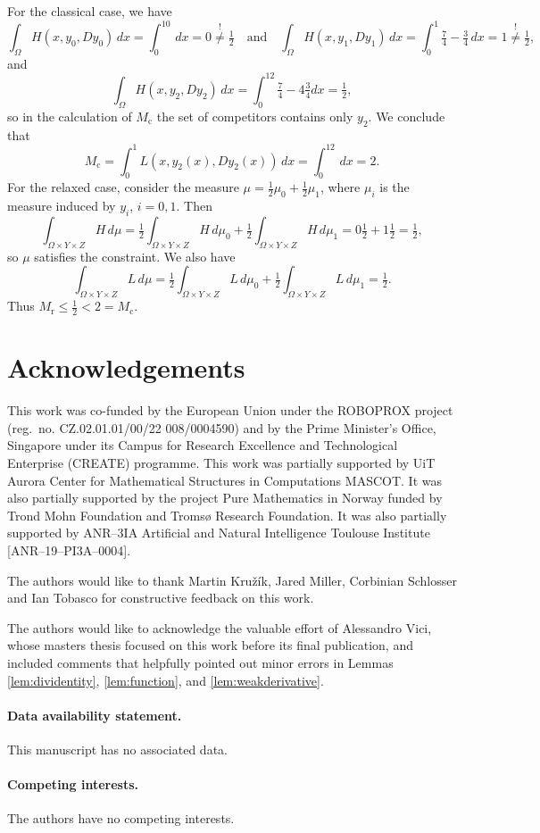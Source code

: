 \documentclass{article}
\theoremstyle{definition}
\theoremstyle{remark}
\begin{document}
 For the classical case, we have
 \[\int_{\Omega}H(x,y_0,Dy_0)\,dx=\int_0^10\,dx=0\stackrel{!}\neq\tfrac12 \quad\textrm{and}\quad\int_{\Omega}H(x,y_1,Dy_1)\,dx=\int_0^1\tfrac74-\tfrac34\,dx=1\stackrel!\neq \tfrac12,\]
 and
 \[\int_{\Omega}H(x,y_2,Dy_2)\,dx=\int_0^12\tfrac74-4\tfrac34dx=\tfrac12,\]
 so in the calculation of $M_\mathrm{c}$ the set of competitors contains only $y_2$. We conclude that \[M_\mathrm{c}=\int_0^1L(x,y_2(x),Dy_2(x))\,dx=\int_0^12\,dx=2.\]
 For the relaxed case, consider the measure  $\mu=\frac12\mu_0+\frac12\mu_1$, where $\mu_i$ is the measure induced by $y_i$, $i=0,1$. Then 
 \[\int_{\Omega\times Y\times Z}H\,d\mu=\tfrac12\int_{\Omega\times Y\times Z}H\,d\mu_0+\tfrac12\int_{\Omega\times Y\times Z}H\,d\mu_1=0\tfrac{1}{2}+1\tfrac12=\tfrac12,\]
 so $\mu$ satisfies the constraint. We also have
 \[\int_{\Omega\times Y\times Z}L\,d\mu=\tfrac12\int_{\Omega\times Y\times Z}L\,d\mu_0+\tfrac12\int_{\Omega\times Y\times Z}L\,d\mu_1=\tfrac12.\]
 Thus $M_\mathrm{r}\leq \frac12<2=M_\mathrm{c}$.

\section{Acknowledgements}
This work was co-funded by the European Union under the ROBOPROX project (reg.~no. CZ.02.01.01/00/22 008/0004590) and by the Prime Minister’s Office, Singapore under its Campus for Research Excellence and Technological Enterprise (CREATE) programme.
This work was partially supported by UiT Aurora Center for Mathematical
Structures in Computations MASCOT. It was also partially supported by the project Pure Mathematics in Norway funded by Trond Mohn Foundation and Tromsø Research Foundation. It was also partially supported by ANR--3IA Artificial and Natural Intelligence Toulouse Institute [ANR--19--PI3A--0004].

The authors would like to thank Martin Kru\v z\'ik, Jared Miller, Corbinian Schlosser and Ian Tobasco for constructive feedback on this work.

The authors would like to acknowledge the valuable effort of Alessandro Vici, whose masters thesis \cite{vici} focused on this work before its final publication, and included comments that helpfully pointed out minor errors in Lemmas \ref{lem:dividentity}, \ref{lem:function}, and \ref{lem:weakderivative}.

\paragraph{Data availability statement.} This manuscript has no associated data.
\paragraph{Competing interests.} The authors have no competing interests.


{}

%
\end{document}
